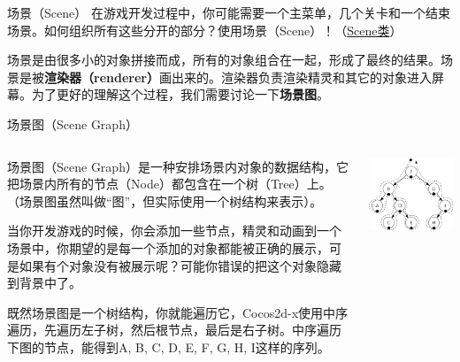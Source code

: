 \documentclass{beamer}
\newcommand{\hrefcol}[2]{\textcolor{cyan}{\href{#1}{#2}}}
\begin{document}

\begin{frame}[fragile]{场景（Scene）}
在游戏开发过程中，你可能需要一个主菜单，几个关卡和一个结束场景。如何组织所有这些分开的部分？使用场景（Scene）！（\hrefcol{https://github.com/MinmusLin/Teamfight_Tactics/tree/main/Classes/Scene}{Scene类}）

\vspace{1em}

场景是由很多小的对象拼接而成，所有的对象组合在一起，形成了最终的结果。场景是被\textbf{渲染器（renderer）}画出来的。渲染器负责渲染精灵和其它的对象进入屏幕。为了更好的理解这个过程，我们需要讨论一下\textbf{场景图}。
\end{frame}


\begin{frame}[fragile]{场景图（Scene Graph）}
\begin{columns}
\begin{column}{0.65\textwidth}
场景图（Scene Graph）是一种安排场景内对象的数据结构，它把场景内所有的节点（Node）都包含在一个树（Tree）上。（场景图虽然叫做“图”，但实际使用一个树结构来表示）。

\vspace{1em}

当你开发游戏的时候，你会添加一些节点，精灵和动画到一个场景中，你期望的是每一个添加的对象都能被正确的展示，可是如果有个对象没有被展示呢？可能你错误的把这个对象隐藏到背景中了。

\vspace{1em}

既然场景图是一个树结构，你就能遍历它，Cocos2d-x使用中序遍历，先遍历左子树，然后根节点，最后是右子树。中序遍历下图的节点，能得到A, B, C, D, E, F, G, H, I这样的序列。
\end{column}
\begin{column}{0.35\textwidth}
\includegraphics[width=\textwidth]
{figures/scene_graph}
\end{column}
\end{columns}
\end{frame}
\end{document}
